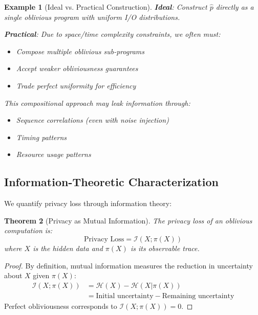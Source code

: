 \documentclass[11pt,final]{article}
\newtheorem{theorem}{Theorem}[section]
\newtheorem{example}[theorem]{Example}
\renewcommand{\Pattern}[1]{\pi(#1)}
\newcommand{\Entropy}[1]{\mathcal{H}(#1)}
\newcommand{\MutualInfo}[2]{\mathcal{I}(#1; #2)}
\begin{document}
\begin{example}[Ideal vs. Practical Construction]
\textbf{Ideal}: Construct $\hat{p}$ directly as a single oblivious program with uniform I/O distributions.

\textbf{Practical}: Due to space/time complexity constraints, we often must:
\begin{itemize}
    \item Compose multiple oblivious sub-programs
    \item Accept weaker obliviousness guarantees
    \item Trade perfect uniformity for efficiency
\end{itemize}
This compositional approach may leak information through:
\begin{itemize}
    \item Sequence correlations (even with noise injection)
    \item Timing patterns
    \item Resource usage patterns
\end{itemize}
\end{example}

\subsection{Information-Theoretic Characterization}

We quantify privacy loss through information theory:

\begin{theorem}[Privacy as Mutual Information]
The privacy loss of an oblivious computation is:
\begin{equation}
\text{Privacy Loss} = \MutualInfo{X}{\Pattern{X}}
\end{equation}
where $X$ is the hidden data and $\Pattern{X}$ is its observable trace.
\end{theorem}

\begin{proof}
By definition, mutual information measures the reduction in uncertainty about $X$ given $\Pattern{X}$:
\begin{align}
\MutualInfo{X}{\Pattern{X}} &= \Entropy{X} - \Entropy{X|\Pattern{X}} \\
&= \text{Initial uncertainty} - \text{Remaining uncertainty}
\end{align}
Perfect obliviousness corresponds to $\MutualInfo{X}{\Pattern{X}} = 0$.
\end{proof}
\end{document}
